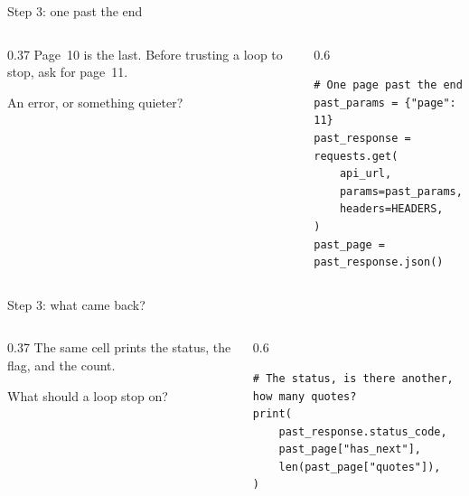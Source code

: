 \documentclass[9pt,aspectratio=169]{beamer}
\begin{document}
\begin{frame}[fragile]{Step 3: one past the end}
    \begin{columns}[T]
        \begin{column}{0.37\textwidth}
            Page~10 is the last. Before trusting a loop to stop, ask for page~11.

            \medskip
            An error, or something quieter?
        \end{column}
        \begin{column}{0.6\textwidth}
\begin{lstlisting}[style=lab]
# One page past the end
past_params = {"page": 11}
past_response = requests.get(
    api_url,
    params=past_params,
    headers=HEADERS,
)
past_page = past_response.json()
\end{lstlisting}
        \end{column}
    \end{columns}
\end{frame}

\begin{frame}[fragile]{Step 3: what came back?}
    \begin{columns}[T]
        \begin{column}{0.37\textwidth}
            The same cell prints the status, the flag, and the count.

            \medskip
            What should a loop stop on?
        \end{column}
        \begin{column}{0.6\textwidth}
\begin{lstlisting}[style=lab]
# The status, is there another, how many quotes?
print(
    past_response.status_code,
    past_page["has_next"],
    len(past_page["quotes"]),
)
\end{lstlisting}
        \end{column}
    \end{columns}
\end{frame}
\end{document}
